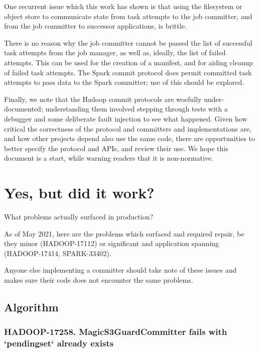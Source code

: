 \documentclass[conference]{IEEEtran}
\begin{document}
One recurrent issue which this work has shown is that using the
filesystem or object store to communicate state from task attempts
to the job committer, and from the job committer to successor
applications, is brittle.

There is no reason why the job committer cannot be passed the list of
successful task attempts from the job manager, as well as, ideally,
the list of failed attempts.
This can be used for the creation of a manifest, and for aiding cleanup
of failed task attempts.
The Spark commit protocol does permit committed task attempts to pass data
to the Spark committer;
use of this should be explored.


Finally, we note that the Hadoop commit protocols are woefully under-documented;
understanding them involved stepping through tests with a debugger and
some deliberate fault injection to see what happened.
Given how critical the correctness of the protocol and committers and implementations
are, and how other projects depend also use the same code, there
are opportunities to better specify the protocol and APIs, and review
their use.
We hope this document is a start, while warning readers that it is non-normative.




\section{Yes, but did it work?}
\label{sec:production}


What problems actually surfaced in production?

As of May 2021, here are the problems which surfaced
and required repair, be they minor (HADOOP-17112) or
significant and application spanning (HADOOP-17414, SPARK-33402).

Anyone else implementing a committer should take note of
these issues and makes sure their code does not encounter
the same problems.

\subsection{Algorithm}
\label{subsec:algorithm}

\subsubsection{HADOOP-17258. MagicS3GuardCommitter fails with `pendingset` already exists}
\end{document}
